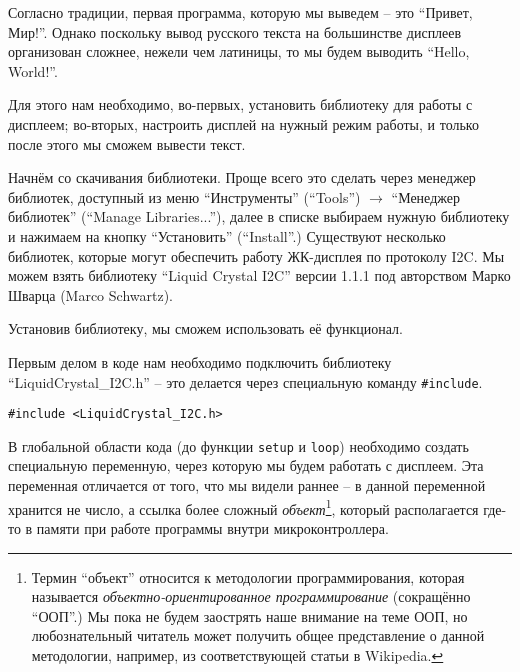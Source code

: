 \documentclass[../sparc.tex]{subfiles}
\begin{document}


Согласно традиции, первая программа, которую мы выведем -- это ``Привет, Мир!''.
Однако поскольку вывод русского текста на большинстве дисплеев организован
сложнее, нежели чем латиницы, то мы будем выводить ``Hello, World!''.

Для этого нам необходимо, во-первых, установить библиотеку для работы с
дисплеем; во-вторых, настроить дисплей на нужный режим работы, и только после
этого мы сможем вывести текст.

Начнём со скачивания библиотеки.  Проще всего это сделать через менеджер
библиотек, доступный из меню ``Инструменты'' (``Tools'') $\rightarrow$ ``Менеджер
библиотек'' (``Manage Libraries...''), далее в списке выбираем нужную библиотеку
и нажимаем на кнопку ``Установить'' (``Install''.)  Существуют несколько
библиотек, которые могут обеспечить работу ЖК-дисплея по протоколу \gls{I2C}.
Мы можем взять библиотеку ``Liquid Crystal I2C'' версии 1.1.1 под авторством
Марко Шварца (Marco Schwartz).

Установив библиотеку, мы сможем использовать её функционал.

Первым делом в коде нам необходимо подключить библиотеку
``LiquidCrystal\_I2C.h'' -- это делается через специальную команду
\texttt{\#include}.

\begin{verbatim}
#include <LiquidCrystal_I2C.h>
\end{verbatim}

В глобальной области кода (до функции \texttt{setup} и \texttt{loop}) необходимо
создать специальную переменную, через которую мы будем работать с дисплеем. Эта
переменная отличается от того, что мы видели раннее -- в данной переменной
хранится не число, а ссылка более сложный \emph{объект}\footnote{Термин
``объект'' относится к методологии программирования, которая называется
\emph{объектно-ориентированное программирование} (сокращённо ``ООП''.)  Мы пока
не будем заострять наше внимание на теме ООП, но любознательный читатель может
получить общее представление о данной методологии, например, из соответствующей
статьи в Wikipedia.}, который располагается где-то в памяти при работе программы
внутри микроконтроллера.
\end{document}
